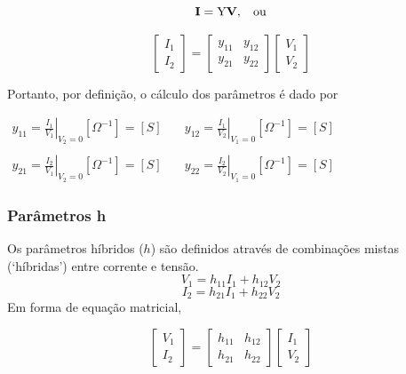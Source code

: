 \documentclass{article}
\numberwithin{equation}{section}
\begin{document}
\begin{equation*}
    \textbf{I}=\text{Y}\textbf{V}, \hspace{0.3cm} \text{ou}
\end{equation*}

\begin{equation}
    \begin{bmatrix}
        I_{1} \\
        I_{2}
    \end{bmatrix}
    = %
    \begin{bmatrix}
        y_{11} & y_{12} \\
        y_{21} & y_{22}
    \end{bmatrix}
    \begin{bmatrix}
        V_{1} \\
        V_{2}
    \end{bmatrix}
\end{equation}

\noindent Portanto, por definição, o cálculo dos parâmetros é dado por
\begin{center}
    $\begin{matrix} %
            y_{11}=\displaystyle\left.\frac{I_{1}}{V_{1}}\right|_{V_{2}=0} [\Omega^{-1}]=[S] &\quad y_{12}=\displaystyle\left.\frac{I_{1}}{V_{2}}\right|_{V_{1}=0} [\Omega^{-1}]=[S]\\ \\
            y_{21}=\displaystyle\left.\frac{I_{2}}{V_{1}}\right|_{V_{2}=0} [\Omega^{-1}]=[S] &\quad y_{22}=\displaystyle\left.\frac{I_{2}}{V_{2}}\right|_{V_{1}=0} [\Omega^{-1}]=[S]
    \end{matrix}$
\end{center}

\subsubsection{Parâmetros h}
\label{subsubsec:quadripolosh}
Os parâmetros híbridos ($h$) são definidos através de combinações mistas (`híbridas') entre corrente e tensão.
\begin{equation*}
    V_{1}=h_{11}I_{1}+h_{12}V_{2}
\end{equation*}
\begin{equation*}
    I_{2}=h_{21}I_{1}+h_{22}V_{2}
\end{equation*}
Em forma de equação matricial,

\begin{equation}
    \begin{bmatrix}
        V_{1} \\
        I_{2}
    \end{bmatrix}
    = %
    \begin{bmatrix}
        h_{11} & h_{12} \\
        h_{21} & h_{22}
    \end{bmatrix}
    \begin{bmatrix}
        I_{1} \\
        V_{2}
    \end{bmatrix}
\end{equation}
\end{document}
